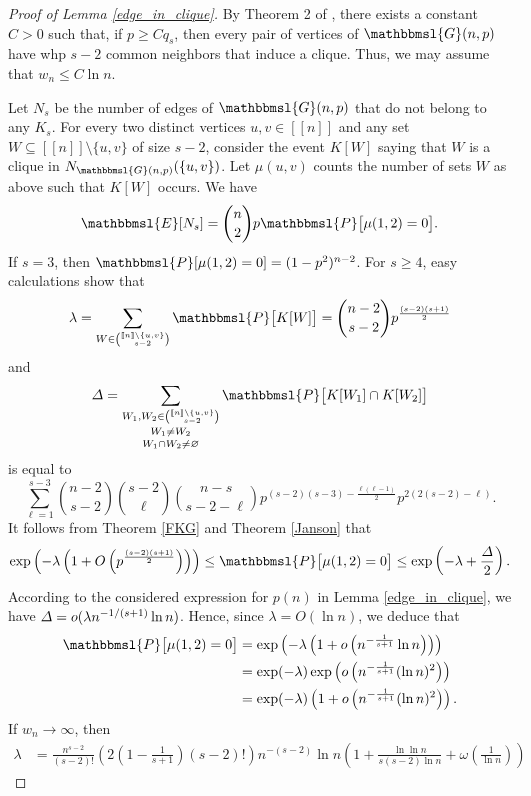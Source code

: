 \documentclass[hidelinks, 11pt]{article}
\theoremstyle{plain}
\theoremstyle{definition}
\begin{document}
\begin{proof}[Proof of Lemma \ref{edge_in_clique}]
By Theorem 2 of  \cite{SP90},  there exists a constant $C>0$ such that, if    $p\geq Cq_s$,   then  every pair of vertices of  $\mathbbmsl{G}(n,p)$     have  whp  $s-2$ common neighbors that induce a clique. Thus, we may assume that $w_n\leq C\ln n$.


Let $N_s$ be the number of edges of  $\mathbbmsl{G}(n,p)$   that do not belong to any $K_s$.
For every two distinct vertices $u,v\in[\![n]\!]$ and any  set   $W\subseteq[\![n]\!]\setminus\{u,v\}$ of size $s-2$, consider the  event $K[W]$ saying that $W$ is a clique in $N_{\mathbbmsl{G}(n,p)}(\{u, v\})$.  Let $\mu(u, v)$ counts the number of sets $W$ as above such that $K[W]$ occurs. We have
\begin{equation}\label{expectation-mu}
\mathbbmsl{E}[N_s]={n\choose 2}p\mathbbmsl{P}\big[\mu(1,2)=0\big].
\end{equation}
If $s=3$, then $\mathbbmsl{P}[\mu(1,2)=0]=(1-p^2)^{n-2}$. For $s\geq 4$, easy  calculations   show that
$$\lambda=\sum_{W\in{[\![n]\!]\setminus\{u, v\}\choose s-2}}\mathbbmsl{P}\big[K[W]\big]={n-2\choose s-2}p^{\frac{(s-2)(s+1)}{2}}$$  and
$$\mathnormal{\Delta}=\mathop{\mathop{\sum_{W_1, W_2\in{[\![n]\!]\setminus\{u,v\}\choose s-2}}}_{W_1\neq W_2}}_{W_1\cap W_2\neq\varnothing}\mathbbmsl{P}\big[K[W_1]\cap K[W_2]\big]$$ is equal to
$$\sum_ {\ell=1}^{s-3}{n-2\choose s-2}{s-2\choose\ell}{n-s\choose s-2-\ell}p^{(s-2)(s-3)-\frac{\ell(\ell-1)}{2}}p^{2(2(s-2)-\ell)}.$$
It follows from  Theorem \ref{FKG} and Theorem \ref{Janson} that
$$\exp\left(-\lambda\left(1+O\left(p^{\frac{(s-2)(s+1)}{2}}\right)\right)\right)\leq\mathbbmsl{P}\big[\mu(1,2)=0\big]\leq
\exp\left(-\lambda+\frac{\mathnormal{\Delta}}{2}\right).$$
According to  the considered expression for  $p(n)$ in  Lemma \ref{edge_in_clique}, we have $\mathnormal{\Delta}=o(\lambda n^{-1/(s+1)}\ln n)$. Hence, since $\lambda=O(\ln n)$,  we deduce  that
\begin{align}
\mathbbmsl{P}\big[\mu(1,2)=0\big]&=\exp\left(-\lambda\left(1+o\left(n^{-\frac{1}{s+1}}\ln n\right)\right)\right)\nonumber\\&=\exp(-\lambda)\exp\left(o\left(n^{-\frac{1}{s+1}}(\ln n)^2\right)\right)\nonumber\\ &=\exp(-\lambda)\left(1+o\left(n^{-\frac{1}{s+1}}(\ln n)^2\right)\right).\label{mu}
\end{align}
If $w_n\to\infty$, then
\begin{align*}
\lambda&=\frac{n^{s-2}}{(s-2)!}\left(2\left(1-\frac{1}{s+1}\right)(s-2)!\right)n^{-(s-2)}\ln n\left(1+\frac{\ln\ln n}{s(s-2)\ln n}+\omega\left(\frac{1}{\ln n}\right)\right)

\end{align*}
\end{proof}
\end{document}
